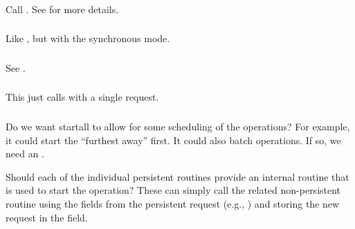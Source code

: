 \documentclass{article}
\begin{document}
\subsubsection{}

\subsubsection{}
Call .  See  for more
details. 

\subsubsection{}
Like , but with the synchronous mode.

\subsubsection{}
See .

\subsubsection{}
This just calls  with a single request.  

\subsubsection{}
Do we want startall to allow for some scheduling of the operations?  For
example, it could start the ``furthest away'' first.  It could also batch
operations.
If so, we need an .

Should each of the individual persistent routines provide an internal
routine that is used to start the operation?
These can simply call the related non-persistent routine using the fields from
the persistent request (e.g., )
and storing the new request in the 
field. 
\end{document}

